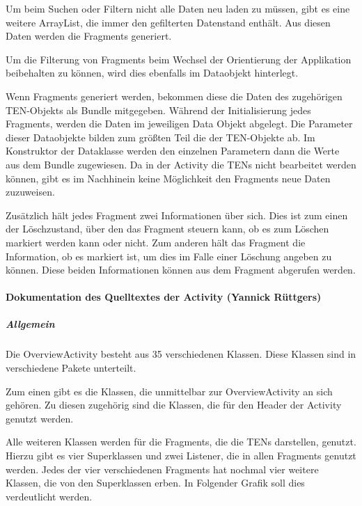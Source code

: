 Um beim Suchen oder Filtern nicht alle Daten neu laden zu müssen, gibt es eine weitere ArrayList, die immer den gefilterten Datenstand enthält. Aus diesen Daten werden die Fragments generiert.

Um die Filterung von Fragments beim Wechsel der Orientierung der Applikation beibehalten zu können, wird dies ebenfalls im Dataobjekt hinterlegt.

Wenn Fragments generiert werden, bekommen diese die Daten des zugehörigen TEN-Objekts als Bundle mitgegeben. Während der Initialisierung jedes Fragments, werden die Daten im jeweiligen Data Objekt abgelegt. Die Parameter dieser Dataobjekte bilden zum größten Teil die der TEN-Objekte ab. Im Konstruktor der Dataklasse werden den einzelnen Parametern dann die Werte aus dem Bundle zugewiesen. Da in der Activity die TENs nicht bearbeitet werden können, gibt es im Nachhinein keine Möglichkeit den Fragments neue Daten zuzuweisen.

Zusätzlich hält jedes Fragment zwei Informationen über sich. Dies ist zum einen der Löschzustand, über den das Fragment steuern kann, ob es zum Löschen markiert werden kann oder nicht. Zum anderen hält das Fragment die Information, ob es markiert ist, um dies im Falle einer Löschung angeben zu können. Diese beiden Informationen können aus dem Fragment abgerufen werden.

\paragraph{Dokumentation des Quelltextes der Activity (Yannick Rüttgers)}

\subparagraph{Allgemein}

Die OverviewActivity besteht aus 35 verschiedenen Klassen. Diese Klassen sind in verschiedene Pakete unterteilt.

Zum einen gibt es die Klassen, die unmittelbar zur OverviewActivity an sich gehören. Zu diesen zugehörig sind die Klassen, die für den Header der Activity genutzt werden.

Alle weiteren Klassen werden für die Fragments, die die TENs darstellen, genutzt. Hierzu gibt es vier Superklassen und zwei Listener, die in allen Fragments genutzt werden. Jedes der vier verschiedenen Fragments hat nochmal vier weitere Klassen, die von den Superklassen erben.
In Folgender Grafik soll dies verdeutlicht werden.

